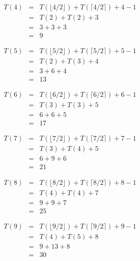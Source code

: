 \documentclass[12pt]{scrartcl}
\begin{document}
\begin{enumerate}
	\begin{eqnarray}
		T(4)		&	=	&	T(\lfloor 4 / 2 \rfloor) + T(\lceil 4 / 2 \rceil) + 4 - 1 \nonumber \\
				&	=	&	T(2)	+	T(2)	+ 3  \nonumber \\
				&	=	&	3 + 3 + 3  \nonumber \\
				&	=	&	9  \nonumber 
	\end{eqnarray}


	\begin{eqnarray}
		T(5)		&	=	&	T(\lfloor 5 / 2 \rfloor) + T(\lceil 5 / 2 \rceil) + 5 - 1 \nonumber \\
				&	=	&	T(2)	+	T(3)	+ 4  \nonumber \\
				&	=	&	3+ 6 + 4  \nonumber \\
				&	=	&	13  \nonumber 
	\end{eqnarray}


	\begin{eqnarray}
		T(6)		&	=	&	T(\lfloor 6 / 2 \rfloor) + T(\lceil 6 / 2 \rceil) + 6 - 1 \nonumber \\
				&	=	&	T(3)	+	T(3)	+ 5  \nonumber \\
				&	=	&	6 + 6 + 5  \nonumber \\
				&	=	&	17  \nonumber 
	\end{eqnarray}
	
	\begin{eqnarray}
		T(7)		&	=	&	T(\lfloor 7 / 2 \rfloor) + T(\lceil 7 / 2 \rceil) + 7 - 1 \nonumber \\
				&	=	&	T(3)	+	T(4)	+ 5  \nonumber \\
				&	=	&	6 + 9 + 6  \nonumber \\
				&	=	&	21  \nonumber 
	\end{eqnarray}
	
	\begin{eqnarray}
		T(8)		&	=	&	T(\lfloor 8 / 2 \rfloor) + T(\lceil 8 / 2 \rceil) + 8 - 1 \nonumber \\
				&	=	&	T(4)	+	T(4)	+ 7  \nonumber \\
				&	=	&	9 + 9 + 7  \nonumber \\
				&	=	&	25  \nonumber 
	\end{eqnarray}
	
	\begin{eqnarray}
		T(9)		&	=	&	T(\lfloor 9 / 2 \rfloor) + T(\lceil 9 / 2 \rceil) + 9 - 1 \nonumber \\
				&	=	&	T(4)	+	T(5)	+ 8  \nonumber \\
				&	=	&	9 + 13+ 8  \nonumber \\
				&	=	&	30  \nonumber 
	\end{eqnarray}
	

\end{enumerate}
\end{document}
